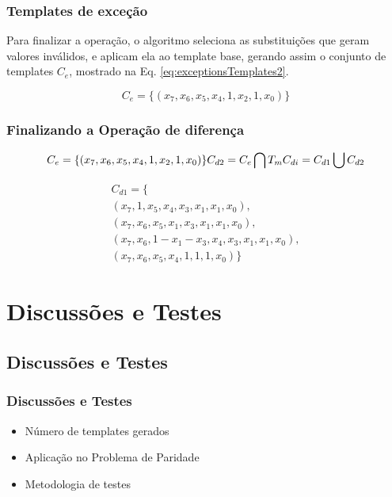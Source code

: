 \documentclass[aspectratio=43,hyperref={pdfpagelabels=false}]{beamer}
\begin{document}
 \begin{frame}
     \frametitle{Templates de exceção}
Para finalizar a operação, o algoritmo seleciona as substituições que geram valores inválidos, e aplicam ela ao template base, gerando assim o conjunto de templates $C_e$, mostrado na  Eq. \ref{eq:exceptionsTemplates2}.

\begin{equation}
C_e = \{(x_7, x_6, x_5, x_4, 1, x_2, 1, x_0)\}
\label{eq:exceptionsTemplates2}
\end{equation}
 \end{frame}

 \begin{frame}
     \frametitle{Finalizando a Operação de diferença}
\begin{equation*}
C_e = \{(x_7, x_6, x_5, x_4, 1, x_2, 1, x_0)\}\\
C_{d2} = C_e \bigcap  T_m\\
C_{di} = C_{d1} \bigcup  C_{d2}

\label{eq:exceptionsTemplates2}
\end{equation*}

    \vspace{-0.8cm}
    \begin{equation}
    \begin{split}
    C_{d1} = \{\\(x_7, 1, x_5, x_4, x_3, x_1, x_1, x_0), \\(x_7, x_6, x_5, x_1, x_3, x_1, x_1, x_0), \\(x_7, x_6, 1 - x_1 - x_3, x_4, x_3, x_1, x_1, x_0), \\(x_7, x_6, x_5, x_4, 1, 1, 1, x_0) \}
    \end{split}
    \label{eq:logicalComplement3}
    \end{equation}


 \end{frame}





 \section{Discussões e Testes}
 \subsection*{Discussões e Testes}
 \begin{frame}
     \frametitle{Discussões e Testes}
     \begin{itemize}
      \item Número de templates gerados
      \item Aplicação no Problema de Paridade
      \item Metodologia de testes
     \end{itemize}
 \end{frame}
\end{document}
